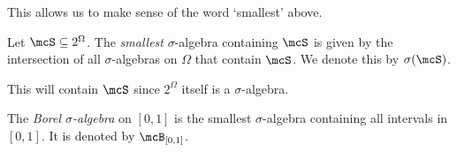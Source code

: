 This allows us to make sense of the word `smallest' above.
\begin{definition} \label{def:sigma:gen}
    Let $\mcS \subseteq 2^\Omega$.
    The \emph{smallest} $\sigma$-algebra containing $\mcS$ is given by the
    intersection of all $\sigma$-algebras on $\Omega$ that contain $\mcS$.
    We denote this by $\sigma(\mcS)$.
\end{definition}
This will contain $\mcS$ since $2^\Omega$ itself is a $\sigma$-algebra.

\begin{example}
    The \emph{Borel $\sigma$-algebra} on $[0, 1]$ is the smallest
    $\sigma$-algebra containing all intervals in $[0, 1]$.
    It is denoted by $\mcB_{[0, 1]}$.
\end{example}
